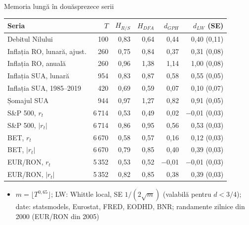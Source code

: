 \begin{frame}{Memoria lungă în douăsprezece serii}
\itemsize{\footnotesize}
\begin{center}
\scriptsize
\begin{tabular}{lrrrrr}
\toprule
\textbf{Seria} & $T$ & $H_{R/S}$ & $H_{DFA}$ & $d_{GPH}$ & $d_{LW}$ (SE) \\
\midrule
Debitul Nilului & 100 & 0{,}83 & 0{,}64 & 0{,}44 & 0{,}40 (0{,}11) \\
Inflația RO, lunară, ajust. & 260 & 0{,}75 & 0{,}84 & 0{,}37 & 0{,}31 (0{,}08) \\
Inflația RO, anuală & 260 & 0{,}96 & 1{,}38 & 1{,}14 & 1{,}00 (0{,}08) \\
Inflația SUA, lunară & 954 & 0{,}83 & 0{,}87 & 0{,}58 & 0{,}55 (0{,}05) \\
Inflația SUA, 1985--2019 & 420 & 0{,}69 & 0{,}59 & 0{,}07 & 0{,}10 (0{,}07) \\
Șomajul SUA & 944 & 0{,}97 & 1{,}27 & 0{,}82 & 0{,}91 (0{,}05) \\
S\&P 500, $r_t$ & 6\,714 & 0{,}53 & 0{,}49 & 0{,}02 & $-$0{,}01 (0{,}03) \\
S\&P 500, $|r_t|$ & 6\,714 & 0{,}86 & 0{,}95 & 0{,}56 & 0{,}53 (0{,}03) \\
BET, $r_t$ & 6\,670 & 0{,}58 & 0{,}57 & 0{,}16 & 0{,}12 (0{,}03) \\
BET, $|r_t|$ & 6\,670 & 0{,}79 & 0{,}85 & 0{,}40 & 0{,}39 (0{,}03) \\
EUR/RON, $r_t$ & 5\,352 & 0{,}53 & 0{,}52 & $-$0{,}01 & $-$0{,}01 (0{,}03) \\
EUR/RON, $|r_t|$ & 5\,352 & 0{,}82 & 0{,}85 & 0{,}38 & 0{,}39 (0{,}03) \\
\bottomrule
\end{tabular}
\end{center}
\begin{itemize}
    \item $m = \lfloor T^{0{,}65}\rfloor$; LW: Whittle local, SE $1/(2\sqrt m)$ (valabilă pentru $d < 3/4$); date: statsmodels, Eurostat, FRED, EODHD, BNR; randamente zilnice din 2000 (EUR/RON din 2005)
\end{itemize}
\end{frame}

